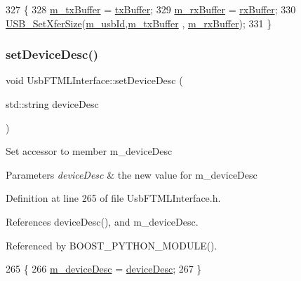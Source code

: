\begin{DoxyCode}
327                                               \{
328     \hyperlink{classUsbFTMLInterface_a4057fb62dc732ffe98df5c46231d7a23}{m\_txBuffer} = \hyperlink{classUsbFTMLInterface_ada338c9311fdb6d788a951f41cf9101f}{txBuffer};
329     \hyperlink{classUsbFTMLInterface_a8f0f8bb2a4fe14ca4890695f41fbcbf8}{m\_rxBuffer} = \hyperlink{classUsbFTMLInterface_a41db8f21098bca8fb7a85ce1058ab10b}{rxBuffer};
330     \hyperlink{LALUsbML_8h_a671ccd24a9539d26bae5926a06662129}{USB\_SetXferSize}(\hyperlink{classUsbFTMLInterface_aab6754587c303660d5c498ce34a2b4c8}{m\_usbId},\hyperlink{classUsbFTMLInterface_a4057fb62dc732ffe98df5c46231d7a23}{m\_txBuffer} , 
      \hyperlink{classUsbFTMLInterface_a8f0f8bb2a4fe14ca4890695f41fbcbf8}{m\_rxBuffer});
331   \}
\end{DoxyCode}
\mbox{\label{classUsbFTMLInterface_a8be842aa510ff8f915a9ad31f11154a0}} 
\subsubsection{\texorpdfstring{set\+Device\+Desc()}{setDeviceDesc()}}
{\footnotesize\ttfamily void Usb\+F\+T\+M\+L\+Interface\+::set\+Device\+Desc (\begin{DoxyParamCaption}\item[{std\+::string}]{device\+Desc }\end{DoxyParamCaption})\hspace{0.3cm}{\ttfamily [inline]}}

Set accessor to member m\+\_\+device\+Desc 
\begin{DoxyParams}{Parameters}
{\em device\+Desc} & the new value for m\+\_\+device\+Desc \\
\hline
\end{DoxyParams}


Definition at line 265 of file Usb\+F\+T\+M\+L\+Interface.\+h.



References device\+Desc(), and m\+\_\+device\+Desc.



Referenced by B\+O\+O\+S\+T\+\_\+\+P\+Y\+T\+H\+O\+N\+\_\+\+M\+O\+D\+U\+L\+E().


\begin{DoxyCode}
265                                             \{
266     \hyperlink{classUsbFTMLInterface_a15063a6d03335ec8988e41eb61a1ab9f}{m\_deviceDesc} = \hyperlink{classUsbFTMLInterface_ab541b4c57c1e7e947037acbfebc3fe3b}{deviceDesc};
267   \}
\end{DoxyCode}
\mbox{\label{classUsbFTMLInterface_a01a8080338c5de181ad70b7506c97bc4}} 
